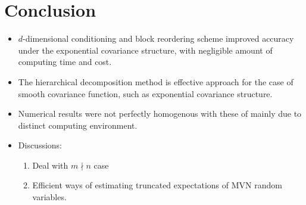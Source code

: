\section{Conclusion}

\begin{frame}{\secname}

    \begin{itemize}
        \item $d$-dimensional conditioning and block reordering scheme improved accuracy under the exponential covariance structure, with negligible amount of computing time and cost.
        \item The hierarchical decomposition method is effective approach for the case of smooth covariance function, such as exponential covariance structure.
        \item Numerical results were not perfectly homogenous with these of \citet{cao2019hierarchical} mainly due to distinct computing environment.
        \item Discussions:
            \begin{enumerate}
                \item Deal with $m \nmid n$ case 
                \item Efficient ways of estimating truncated expectations of MVN random variables.
            \end{enumerate}
    \end{itemize}
    
\end{frame}
